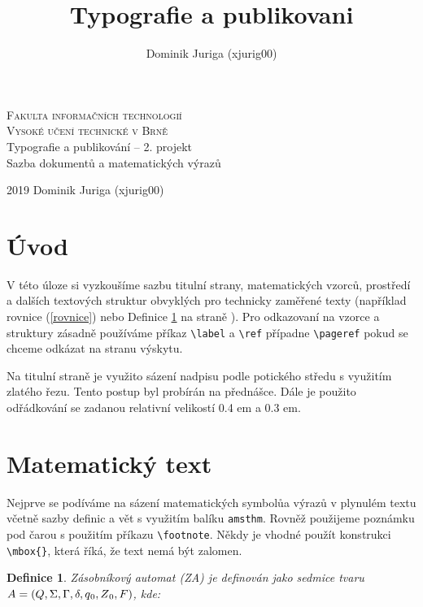 \documentclass[11pt,a4paper,twocolumn]{article}
\author{Dominik Juriga (xjurig00)}
\title{Typografie a publikovani}
\newtheorem{definition}{Definice}
\begin{document}
	\begin{titlepage}
		\begin{center}
			{\Huge \textsc{Fakulta informačních technologií\\
					[0,4em]Vysoké učení technické v Brně}}\\ 
			{\LARGE Typografie a publikování – 2. projekt\\[0,3em]Sazba dokumentů a matematických výrazů}\\
		\end{center}
		{\Large 2019 \hfill
			Dominik Juriga (xjurig00)}
	\end{titlepage}
	\begin{twocolumn}
		\section*{Úvod}\label{page1}
		V této úloze si vyzkoušíme sazbu titulní strany, matematic\-kých vzorců, prostředí a dalších textových struktur obvyklých pro technicky zaměřené texty (například rovnice (\ref{rovnice}) nebo Definice \ref{definice1} na straně \pageref{page1}). Pro odkazovaní na vzorce a struktury zásadně používáme příkaz \verb|\label| a \verb|\ref| případne \verb|\pageref| pokud se chceme odkázat na stranu výskytu.
		
		Na titulní straně je využito sázení nadpisu podle potického středu s využitím zlatého řezu. Tento postup byl probírán na přednášce. Dále je použito odřádkování se zadanou relativní velikostí 0.4 em a 0.3 em.
		\section{Matematický text}
		Nejprve se podíváme na sázení matematických symbolů\linebreak a výrazů v plynulém textu včetně sazby definic a vět s vy\-užitím balíku \texttt{amsthm}. Rovněž použijeme poznámku pod čarou s použitím příkazu \verb|\footnote|. Někdy je vhodné použít konstrukci \verb|\mbox{}|, která říká, že text nemá být zalomen.
		
		\theoremstyle{definition}
		\begin{definition}\label{definice1}
			{\normalfont Zásobníkový automat (ZA) \emph{je definován jako sedmice tvaru} $A = (Q, \Sigma, \Gamma, \delta, q\textsubscript{0}, Z\textsubscript{0}, F)$\emph{, kde:}}
			

\end{definition}
\end{twocolumn}
\end{document}
